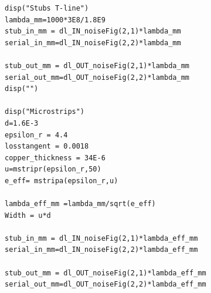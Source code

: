 \documentclass{article}
\begin{document}
\begin{verbatim}
disp("Stubs T-line")
lambda_mm=1000*3E8/1.8E9
stub_in_mm = dl_IN_noiseFig(2,1)*lambda_mm
serial_in_mm=dl_IN_noiseFig(2,2)*lambda_mm

stub_out_mm = dl_OUT_noiseFig(2,1)*lambda_mm
serial_out_mm=dl_OUT_noiseFig(2,2)*lambda_mm
disp("")

disp("Microstrips")
d=1.6E-3
epsilon_r = 4.4
losstangent = 0.0018
copper_thickness = 34E-6
u=mstripr(epsilon_r,50)
e_eff= mstripa(epsilon_r,u)

lambda_eff_mm =lambda_mm/sqrt(e_eff)
Width = u*d

stub_in_mm = dl_IN_noiseFig(2,1)*lambda_eff_mm
serial_in_mm=dl_IN_noiseFig(2,2)*lambda_eff_mm

stub_out_mm = dl_OUT_noiseFig(2,1)*lambda_eff_mm
serial_out_mm=dl_OUT_noiseFig(2,2)*lambda_eff_mm

\end{verbatim}
\end{document}
